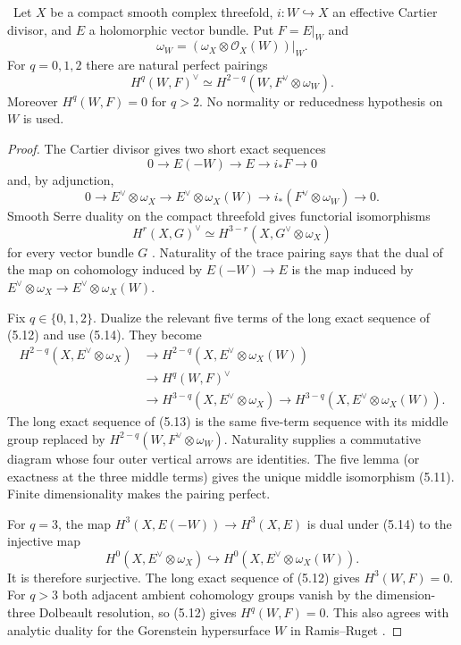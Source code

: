 \begin{theorem}
\label{thm:cartier-duality}
\Verified\ Let $X$ be a compact smooth complex threefold,
$i:W\hookrightarrow X$ an effective Cartier divisor, and $E$ a holomorphic
vector bundle.  Put $F=E|_W$ and
\[
\omega_W=(\omega_X\otimes\mathcal O_X(W))|_W.
\]
For $q=0,1,2$ there are natural perfect pairings
\[
H^q(W,F)^\vee
\simeq H^{2-q}(W,F^\vee\otimes\omega_W).
\tag{5.11}
\]
Moreover $H^q(W,F)=0$ for $q>2$.  No normality or reducedness hypothesis on
$W$ is used.
\end{theorem}

\begin{proof}
The Cartier divisor gives two short exact sequences
\[
0\to E(-W)\to E\to i_*F\to0
\tag{5.12}
\]
and, by adjunction,
\[
0\to E^\vee\otimes\omega_X
\to E^\vee\otimes\omega_X(W)
\to i_*(F^\vee\otimes\omega_W)\to0.
\tag{5.13}
\]
Smooth Serre duality on the compact threefold gives functorial isomorphisms
\[
H^r(X,G)^\vee\simeq H^{3-r}(X,G^\vee\otimes\omega_X)
\tag{5.14}
\]
for every vector bundle $G$
\cite[Theorem~9.37]{Lee2024}.  Naturality of the trace pairing says that the
dual of the map on cohomology induced by $E(-W)\to E$ is the map induced by
$E^\vee\otimes\omega_X\to E^\vee\otimes\omega_X(W)$.

Fix $q\in\{0,1,2\}$.  Dualize the relevant five terms of the long exact
sequence of (5.12) and use (5.14).  They become
\[
\begin{split}
H^{2-q}(X,E^\vee\otimes\omega_X)
&\longrightarrow H^{2-q}(X,E^\vee\otimes\omega_X(W))\\
&\longrightarrow H^q(W,F)^\vee\\
&\longrightarrow H^{3-q}(X,E^\vee\otimes\omega_X)
\longrightarrow H^{3-q}(X,E^\vee\otimes\omega_X(W)).
\end{split}
\tag{5.15}
\]
The long exact sequence of (5.13) is the same five-term sequence with its
middle group replaced by
$H^{2-q}(W,F^\vee\otimes\omega_W)$.  Naturality supplies a commutative
diagram whose four outer vertical arrows are identities.  The five lemma
(or exactness at the three middle terms) gives the unique middle isomorphism
(5.11).  Finite dimensionality makes the pairing perfect.

For $q=3$, the map
$H^3(X,E(-W))\to H^3(X,E)$ is dual under (5.14) to the injective map
\[
H^0(X,E^\vee\otimes\omega_X)
\hookrightarrow H^0(X,E^\vee\otimes\omega_X(W)).
\]
It is therefore surjective.  The long exact sequence of (5.12) gives
$H^3(W,F)=0$.  For $q>3$ both adjacent ambient cohomology groups vanish by
the dimension-three Dolbeault resolution, so (5.12) gives
$H^q(W,F)=0$.  This also agrees with analytic duality for the Gorenstein
hypersurface $W$ in Ramis--Ruget
\cite[Theorems~1--2 and Proposition~2]{RamisRuget1970}.
\end{proof}

